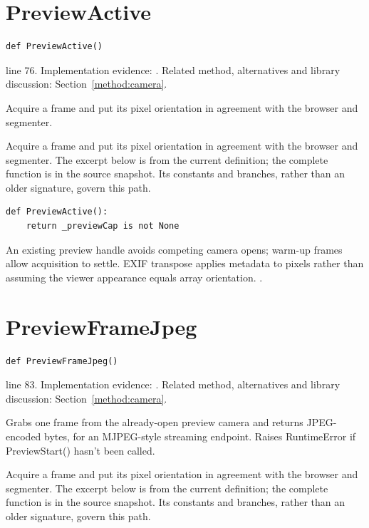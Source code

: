\section{PreviewActive}\label{fn:web-camera:PreviewActive}
\begin{lstlisting}[style=sig]
def PreviewActive()
\end{lstlisting}
 line 76. Implementation evidence: \cite{code2026}. Related method, alternatives and library discussion: Section~\ref{method:camera}.


Acquire a frame and put its pixel orientation in agreement with the browser and segmenter.


Acquire a frame and put its pixel orientation in agreement with the browser and segmenter. The excerpt below is from the current definition; the complete function is in the source snapshot. Its constants and branches, rather than an older signature, govern this path.


\begin{lstlisting}[style=plain]
def PreviewActive():
    return _previewCap is not None
\end{lstlisting}
An existing preview handle avoids competing camera opens; warm-up frames allow acquisition to settle. EXIF transpose applies metadata to pixels rather than assuming the viewer appearance equals array orientation. \cite{opencvcamera,pillowops}.


\section{PreviewFrameJpeg}\label{fn:web-camera:PreviewFrameJpeg}
\begin{lstlisting}[style=sig]
def PreviewFrameJpeg()
\end{lstlisting}
 line 83. Implementation evidence: \cite{code2026}. Related method, alternatives and library discussion: Section~\ref{method:camera}.


Grabs one frame from the already-open preview camera and returns JPEG-encoded bytes, for an MJPEG-style streaming endpoint. Raises RuntimeError if PreviewStart() hasn't been called.


Acquire a frame and put its pixel orientation in agreement with the browser and segmenter. The excerpt below is from the current definition; the complete function is in the source snapshot. Its constants and branches, rather than an older signature, govern this path.


